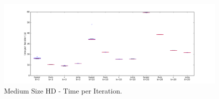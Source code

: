 \begin{figure}[htsb]
  \centerline{
    \includegraphics[scale=0.4, trim="0cm 1cm 0cm 0cm"]{figures/charts/15Mxhd_all}
  }
  \caption[Medium Size HD - Time per Iteration]{Medium Size HD - Time per Iteration.}
  \label{fig:15Mxhd_all}
\end{figure}



